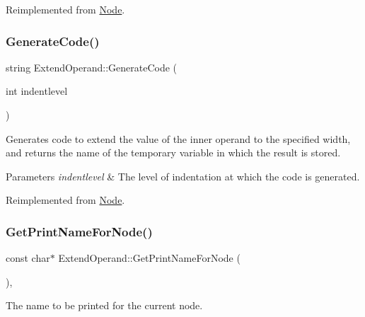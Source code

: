 Reimplemented from \hyperlink{class_node_a5f88d55c6f253a29def7ccc443d83d47}{Node}.

\mbox{\label{class_extend_operand_a42bd225e28413b11c5caa6f7f83de37d}} 
\subsubsection{\texorpdfstring{Generate\+Code()}{GenerateCode()}}
{\footnotesize\ttfamily string Extend\+Operand\+::\+Generate\+Code (\begin{DoxyParamCaption}\item[{int}]{indentlevel }\end{DoxyParamCaption})\hspace{0.3cm}{\ttfamily [virtual]}}

Generates code to extend the value of the inner operand to the specified width, and returns the name of the temporary variable in which the result is stored. 
\begin{DoxyParams}{Parameters}
{\em indentlevel} & The level of indentation at which the code is generated. \\
\hline
\end{DoxyParams}


Reimplemented from \hyperlink{class_node_acb60e526730e8436056375a3055c2c32}{Node}.

\mbox{\label{class_extend_operand_ac5848e09b0f85359a5640d2d721b39be}} 
\subsubsection{\texorpdfstring{Get\+Print\+Name\+For\+Node()}{GetPrintNameForNode()}}
{\footnotesize\ttfamily const char$\ast$ Extend\+Operand\+::\+Get\+Print\+Name\+For\+Node (\begin{DoxyParamCaption}{ }\end{DoxyParamCaption})\hspace{0.3cm}{\ttfamily [inline]}, {\ttfamily [virtual]}}

The name to be printed for the current node. 

